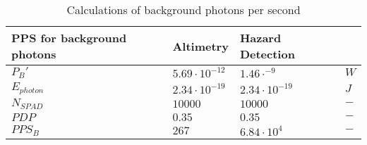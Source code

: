 \begin{table}[h]
\centering
\caption{Calculations of background photons per second}
\label{tab:PPS_B}
\begin{tabular}{|l|lll|} \hline
\textbf{PPS for background photons} & \textbf{Altimetry} & \textbf{Hazard Detection} &   \\ \hline
$P_B'$           & $5.69\cdot10^{-12}$ & $1.46\cdot^{-9}$     & $W$ \\
$E_{photon}$     & $2.34\cdot10^{-19}$ & $2.34\cdot10^{-19}$  & $J$ \\
$N_{SPAD}$       & $10000$             & $10000$              & $-$    \\
$PDP$            & $0.35$              & $0.35$               & $-$    \\
$PPS_B$          & $267$               & $6.84\cdot10^4$      & $-$    \\ \hline
\end{tabular}
\end{table}